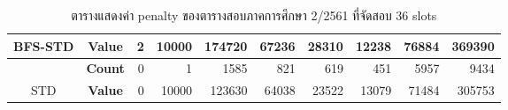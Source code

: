 \begin{table}[]
{\begin{tabular}{@{}ccrrrrrrrr@{}}
    \multirow{-2}{*}{BFS-STD}                    & \textbf{Value}                        & 2                              & 10000                          & 174720                         & 67236                          & 28310                          & 12238                          & 76884                          & 369390                           \\ \midrule
                                                  & {\textbf{Count}} & {0}       & {1}       & {1585}    & {821}     & {619}     & {451}     & {5957}    & {9434}      \\ \cmidrule(l){2-10} 
    \multirow{-2}{*}{STD} & {\textbf{Value}} & {0}       & {10000}   & {123630}  & {64038}   & {23522}   & {13079}   & {71484}   & {305753}    \\ \bottomrule
    \end{tabular}%
    }
    \caption{ตารางแสดงค่า penalty ของตารางสอบภาคการศึกษา 2/2561 ที่จัดสอบ 36 slots}
    \label{tab:result_table_261_36}
\end{table}
